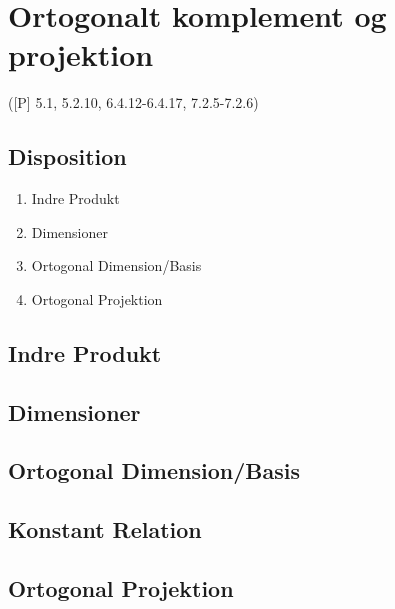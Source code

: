 \newpage
\chapter{Ortogonalt komplement og projektion}
([P] 5.1, 5.2.10, 6.4.12-6.4.17, 7.2.5-7.2.6)

\section*{Disposition}
\begin{enumerate}
	\item Indre Produkt
	\item Dimensioner
	\item Ortogonal Dimension/Basis
	\item Ortogonal Projektion
\end{enumerate}

\section{Indre Produkt}

\section{Dimensioner}


\section{Ortogonal Dimension/Basis}

\section*{Konstant Relation}

\section{Ortogonal Projektion}

